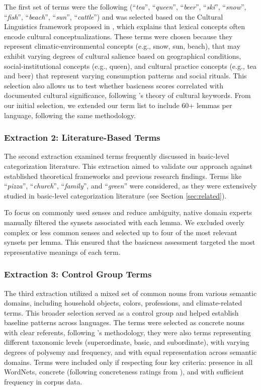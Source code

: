 \documentclass[preprint,12pt,authoryear]{elsarticle}
\begin{document}
The first set of terms were the following (``\textit{tea}'', ``\textit{queen}'', ``\textit{beer}'', ``\textit{ski}'', ``\textit{snow}'', ``\textit{fish}'', ``\textit{beach}'', ``\textit{sun}'', ``\textit{cattle}'') and was selected based on the Cultural Linguistics framework proposed in \cite{sharifian_advances_2017}, which explains that lexical concepts often encode cultural conceptualizations. These terms were chosen because they represent climatic-environmental concepts (e.g., snow, sun, beach), that may exhibit varying degrees of cultural salience based on geographical conditions, social-institutional concepts (e.g., queen), and cultural practice concepts (e.g., tea and beer) that represent varying consumption patterns and social rituals. This selection also allows us to test whether basicness scores correlated with documented cultural significance, following \citet{wierzbicka_understanding_1997}'s theory of cultural keywords. From our initial selection, we extended our term list to include 60+ lemmas per language, following the same methodology.

\subsubsection{Extraction 2: Literature-Based Terms}
\label{sec:ex2}
The second extraction examined terms frequently discussed in basic-level categorization literature. This extraction aimed to validate our approach against established theoretical frameworks and previous research findings. Terms like ``\textit{pizza}'', ``\textit{church}'', ``\textit{family}'', and ``\textit{green}'' were considered, as they were extensively studied in basic-level categorization literature (see Section \ref{sec:related}).


To focus on commonly used senses and reduce ambiguity, native domain experts manually filtered the synsets associated with each lemma. We excluded overly complex or less common senses and selected up to four of the most relevant synsets per lemma. This ensured that the basicness assessment targeted the most representative meanings of each term.

\subsubsection{Extraction 3: Control Group Terms}
\label{sec:ex3}
The third extraction utilized a mixed set of common nouns from various semantic domains, including household objects, colors, professions, and climate-related terms. This broader selection served as a control group and helped establish baseline patterns across languages. The terms were selected as concrete nouns with clear referents, following \citet{rosch_basic_1976}'s methodology, they were also terms representing different taxonomic levels (superordinate, basic, and subordinate), with varying degrees of polysemy and frequency, and with equal representation across semantic domains. Terms were included only if respecting four key criteria: presence in all WordNets, concrete (following concreteness ratings from \cite{brysbaert_concreteness_2013}), and with sufficient frequency in corpus data.
\end{document}
